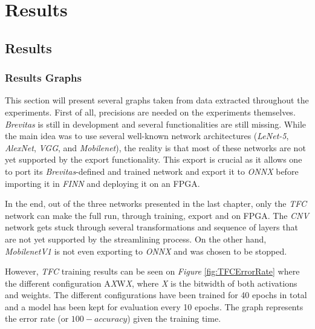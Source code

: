 \chapter{Results} %

\label{Chapter7} %



\section{Results}


\subsection{Results Graphs}

This section will present several graphs taken from data extracted throughout the experiments. First of all, precisions are needed on the experiments themselves. \emph{Brevitas} is still in development and several functionalities are still missing. While the main idea was to use several well-known network architectures (\emph{LeNet-5}, \emph{AlexNet}, \emph{VGG}, and \emph{Mobilenet}), the reality is that most of these networks are not yet supported by the export functionality. This export is crucial as it allows one to port its \emph{Brevitas}-defined and trained network and export it to \emph{ONNX} before importing it in \emph{FINN} and deploying it on an FPGA.

In the end, out of the three networks presented in the last chapter, only the \emph{TFC} network can make the full run, through training, export and on FPGA. The \emph{CNV} network gets stuck through several transformations and sequence of layers that are not yet supported by the streamlining process. On the other hand, \emph{MobilenetV1} is not even exporting to \emph{ONNX} and was chosen to be stopped.

However, \emph{TFC} training results can be seen on \emph{Figure} \ref{fig:TFCErrorRate} where the different configuration A\emph{X}W\emph{X}, where \emph{X} is the bitwidth of both activations and weights. The different configurations have been trained for 40 epochs in total and a model has been kept for evaluation every 10 epochs. The graph represents the error rate (or $100 - accuracy$) given the training time.

